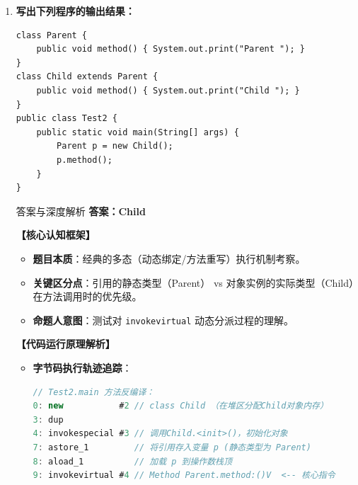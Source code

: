 \documentclass[12pt, a4paper]{ctexart}
\begin{document}
\begin{enumerate}[label=\textbf{\arabic*.}]
	\item[2.] \textbf{写出下列程序的输出结果：}
	      \begin{lstlisting}[]
class Parent {
    public void method() { System.out.print("Parent "); }
}
class Child extends Parent {
    public void method() { System.out.print("Child "); }
}
public class Test2 {
    public static void main(String[] args) {
        Parent p = new Child();
        p.method();
    }
}
\end{lstlisting}

	      \begin{bluebox}{答案与深度解析}
		      \textbf{答案：Child }

		      \textbf{【核心认知框架】}
		      \begin{itemize}[leftmargin=*, nosep]
			      \item \textbf{题目本质}：经典的多态（动态绑定/方法重写）执行机制考察。
			      \item \textbf{关键区分点}：引用的静态类型（Parent） vs 对象实例的实际类型（Child）在方法调用时的优先级。
			      \item \textbf{命题人意图}：测试对 \texttt{invokevirtual} 动态分派过程的理解。
		      \end{itemize}

		      \textbf{【代码运行原理解析】}
		      \begin{itemize}[leftmargin=*]
			      \item \textbf{字节码执行轨迹追踪}：
			            \begin{lstlisting}[language=Java]
// Test2.main 方法反编译：
0: new           #2 // class Child （在堆区分配Child对象内存）
3: dup
4: invokespecial #3 // 调用Child.<init>()，初始化对象
7: astore_1         // 将引用存入变量 p (静态类型为 Parent)
8: aload_1          // 加载 p 到操作数栈顶
9: invokevirtual #4 // Method Parent.method:()V  <-- 核心指令
\end{lstlisting}


\end{itemize}
\end{bluebox}
\end{enumerate}
\end{document}
